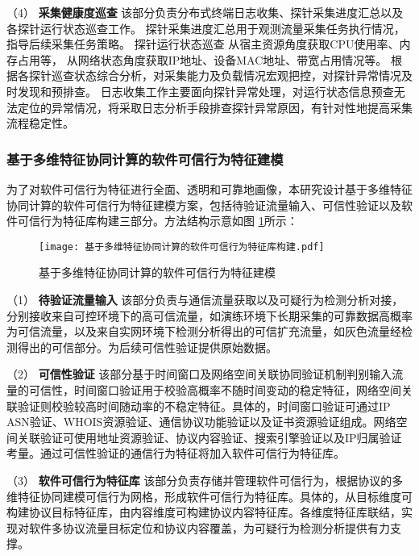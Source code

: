 （4） \textbf{采集健康度巡查}\quad
该部分负责分布式终端日志收集、探针采集进度汇总以及各探针运行状态巡查工作。
探针采集进度汇总用于观测流量采集任务执行情况，指导后续采集任务策略。
探针运行状态巡查
从宿主资源角度获取CPU使用率、内存占用等，
从网络状态角度获取IP地址、设备MAC地址、带宽占用情况等。
根据各探针巡查状态综合分析，对采集能力及负载情况宏观把控，对探针异常情况及时发现和预排查。
日志收集工作主要面向探针异常处理，对运行状态信息预查无法定位的异常情况，将采取日志分析手段排查探针异常原因，有针对性地提高采集流程稳定性。

\subsubsection{基于多维特征协同计算的软件可信行为特征建模}

为了对软件可信行为特征进行全面、透明和可靠地画像，本研究设计基于多维特征协同计算的软件可信行为特征建模方案，包括待验证流量输入、可信性验证以及软件可信行为特征库构建三部分。方法结构示意如图 \ref{fig:基于多维特征协同计算的软件可信行为特征建模}所示：
 
\FloatBarrier
 
\begin{figure}[ht]
  \centering
  \texttt{[image: 基于多维特征协同计算的软件可信行为特征库构建.pdf]}
  \caption{基于多维特征协同计算的软件可信行为特征建模}
  \label{fig:基于多维特征协同计算的软件可信行为特征建模}
\end{figure} 

\FloatBarrier


（1） \textbf{待验证流量输入}\quad
该部分负责与通信流量获取以及可疑行为检测分析对接，分别接收来自可控环境下的高可信流量，如演练环境下长期采集的可靠数据高概率为可信流量，以及来自实网环境下检测分析得出的可信扩充流量，如灰色流量经检测得出的可信部分。为后续可信性验证提供原始数据。

（2） \textbf{可信性验证}\quad
该部分基于时间窗口及网络空间关联协同验证机制判别输入流量的可信性，时间窗口验证用于校验高概率不随时间变动的稳定特征，网络空间关联验证则校验较高时间随动率的不稳定特征。具体的，时间窗口验证可通过IP ASN验证、WHOIS资源验证、通信协议功能验证以及证书资源验证组成。网络空间关联验证可使用地址资源验证、协议内容验证、搜索引擎验证以及IP归属验证考量。通过可信性验证的通信行为特征将加入软件可信行为特征库。

（3） \textbf{软件可信行为特征库}\quad
该部分负责存储并管理软件可信行为，根据协议的多维特征协同建模可信行为网格，形成软件可信行为特征库。具体的，从目标维度可构建协议目标特征库，由内容维度可构建协议内容特征库。各维度特征库联结，实现对软件多协议流量目标定位和协议内容覆盖，为可疑行为检测分析提供有力支撑。 
 
